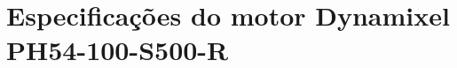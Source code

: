 \documentclass[
12pt,					%
openright,				%
twoside,				%
a4paper,				%
english,
brazil
]{ABNT/abntex2_report}
\begin{document}

	

	\chapter{Especificações do motor Dynamixel PH54-100-S500-R}
	\label{ann:esp_motors_ph54_100}
	
\end{document}
